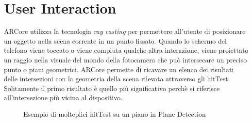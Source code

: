 \documentclass[crop=false, class=book]{standalone}
\begin{document}
	\chapter{User Interaction}
	ARCore utilizza la tecnologia \textit{ray casting} per permettere all'utente di posizionare un oggetto nella scena corrente in un punto fissato. Quando lo schermo del telefono viene toccato o viene compiuta qualche altra interazione, viene proiettato un raggio nella visuale del mondo della fotocamera che può intersecare un preciso punto o piani geometrici. ARCore permette di ricavare un elenco dei risultati delle intersezioni con la geometria della scena rilevata attraverso gli hitTest. Solitamente il primo risultato è quello più significativo perchè si riferisce all'intersezione più vicina al dispositivo.
	
	\begin{figure}
			\centering
			  \quad
			 \quad
			\caption{Esempio di molteplici hitTest su un piano in Plane Detection}
			\label{fig:pet_img}
	\end{figure}
	
\end{document}
